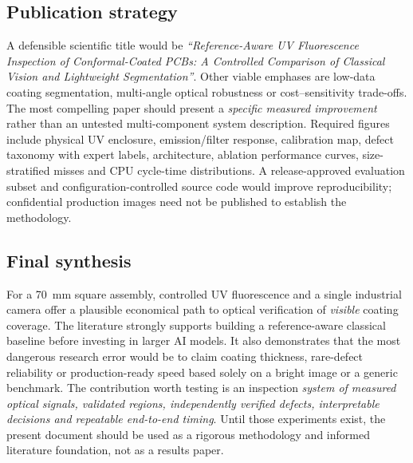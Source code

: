 \subsection{Publication strategy}
A defensible scientific title would be \emph{``Reference-Aware UV Fluorescence Inspection of Conformal-Coated PCBs: A Controlled Comparison of Classical Vision and Lightweight Segmentation''}. Other viable emphases are low-data coating segmentation, multi-angle optical robustness or cost--sensitivity trade-offs. The most compelling paper should present a \emph{specific measured improvement} rather than an untested multi-component system description. Required figures include physical UV enclosure, emission/filter response, calibration map, defect taxonomy with expert labels, architecture, ablation performance curves, size-stratified misses and CPU cycle-time distributions. A release-approved evaluation subset and configuration-controlled source code would improve reproducibility; confidential production images need not be published to establish the methodology.

\subsection{Final synthesis}
For a 70~mm square assembly, controlled UV fluorescence and a single industrial camera offer a plausible economical path to optical verification of \emph{visible} coating coverage. The literature strongly supports building a reference-aware classical baseline before investing in larger AI models. It also demonstrates that the most dangerous research error would be to claim coating thickness, rare-defect reliability or production-ready speed based solely on a bright image or a generic benchmark. The contribution worth testing is an inspection \emph{system of measured optical signals, validated regions, independently verified defects, interpretable decisions and repeatable end-to-end timing}. Until those experiments exist, the present document should be used as a rigorous methodology and informed literature foundation, not as a results paper.
